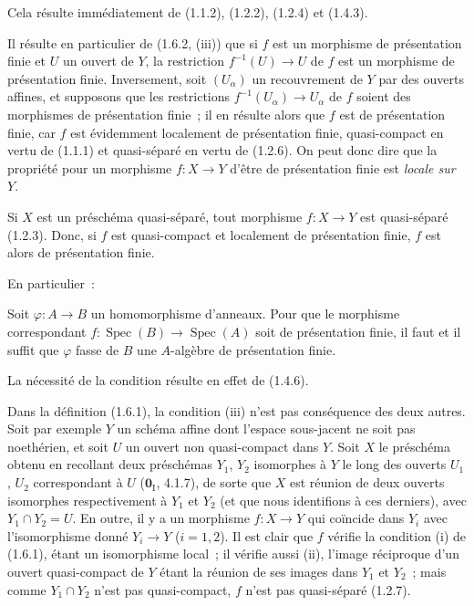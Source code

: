 Cela résulte immédiatement de (1.1.2), (1.2.2), (1.2.4) et (1.4.3).

Il résulte en particulier de (1.6.2, (iii)) que si $f$ est un morphisme de
présentation finie et $U$ un ouvert de $Y$, la restriction
$f^{-1}(U)\to U$ de $f$ est un morphisme de présentation finie. Inversement,
soit $(U_\alpha)$ un recouvrement de $Y$ par des ouverts affines, et supposons
que les restrictions $f^{-1}(U_\alpha)\to U_\alpha$ de $f$ soient des
morphismes de présentation finie~; il en résulte alors que $f$ est de
présentation finie, car $f$ est évidemment localement de présentation finie,
quasi-compact en vertu de (1.1.1) et quasi-séparé en vertu de (1.2.6). On peut
donc dire que la propriété pour un morphisme $f:X\to Y$ d'être de présentation
finie est \emph{locale sur $Y$}.

Si $X$ est un préschéma quasi-séparé, tout morphisme $f:X\to Y$ est
quasi-séparé (1.2.3). Donc, si $f$ est quasi-compact et localement de
présentation finie, $f$ est alors de présentation finie.

En particulier~:

\begin{corollary}[1.6.3]
\label{IV.1.6.3-fr}
Soit $\varphi:A\to B$ un homomorphisme d'anneaux. Pour que le morphisme
correspondant $f:\operatorname{Spec}(B)\to\operatorname{Spec}(A)$ soit de présentation finie, il faut et
il suffit que $\varphi$ fasse de $B$ une $A$-algèbre de présentation finie.
\end{corollary}

La nécessité de la condition résulte en effet de (1.4.6).

\begin{remark}[1.6.4]
\label{IV.1.6.4-fr}
Dans la définition (1.6.1), la condition (iii) n'est pas conséquence des deux
autres. Soit par exemple $Y$ un schéma affine dont l'espace sous-jacent ne
soit pas noethérien, et soit $U$ un ouvert non quasi-compact dans $Y$. Soit
$X$ le préschéma obtenu en recollant deux préschémas $Y_1$, $Y_2$ isomorphes à
$Y$ le long des ouverts $U_1$, $U_2$ correspondant à $U$ ($\mathbf{0}_{\mathrm I}$,
4.1.7), de sorte que $X$ est réunion de deux ouverts isomorphes respectivement
à $Y_1$ et $Y_2$ (et que nous identifions à ces derniers), avec
$Y_1\cap Y_2=U$. En outre, il y a un morphisme $f:X\to Y$ qui coïncide dans
$Y_i$ avec l'isomorphisme donné $Y_i\to Y$ ($i=1,2$). Il est clair que $f$
vérifie la condition (i) de (1.6.1), étant un isomorphisme local~; il vérifie
aussi (ii), l'image réciproque d'un ouvert quasi-compact de $Y$ étant la
réunion de ses images dans $Y_1$ et $Y_2$~; mais comme $Y_1\cap Y_2$ n'est pas
quasi-compact, $f$ n'est pas quasi-séparé (1.2.7).
\end{remark}

